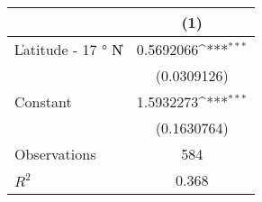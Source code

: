 {
\def\sym#1{\ifmmode^{#1}\else\(^{#1}\)\fi}
\begin{tabular}{l*{1}{c}}
\toprule
                    &\multicolumn{1}{c}{(1)}         \\
\midrule
\|Latitude - 17 $°$ N\|&   0.5692066\sym{***}\\
                    & (0.0309126)         \\
\addlinespace
Constant            &   1.5932273\sym{***}\\
                    & (0.1630764)         \\
\midrule
Observations        &         584         \\
\(R^{2}\)           &       0.368         \\
\bottomrule
\end{tabular}
}
